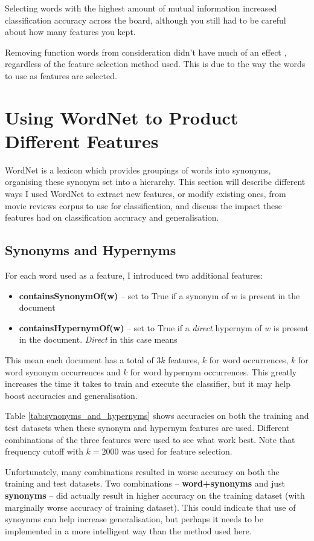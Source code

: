\documentclass{article}
\begin{document}
Selecting words with the highest amount of mutual information increased classification accuracy across the board, although you still had to be careful about how many features you kept.

Removing function words from consideration didn't have much of an effect , regardless of the feature selection method used. This is due to the way the words to use as features are selected.

\section{Using WordNet to Product Different Features}

WordNet is a lexicon which provides groupings of words into synonyms, organising these synonym set into a hierarchy. This section will describe different ways I used WordNet to extract new features, or modify existing ones, from movie reviews corpus to use for classification, and discuss the impact these features had on classification accuracy and generalisation.

\subsection{Synonyms and Hypernyms}

For each word used as a feature, I introduced two additional features:
\begin{itemize}
	\item \textbf{containsSynonymOf(w)} -- set to True if a synonym of $w$ is present in the document
	\item \textbf{containsHypernymOf(w)} -- set to True if a \textit{direct} hypernym of $w$ is present in the document. \textit{Direct} in this case means 
	\end{itemize}
This mean each document has a total of $3k$ features, $k$ for word occurrences, $k$ for word synonym occurrences and $k$ for word hypernym occurrences. This greatly increases the time it takes to train and execute the classifier, but it may help boost accuracies and generalisation.

Table \ref{tab:synonyms_and_hypernyms} shows accuracies on both the training and test datasets when these synonym and hypernym features are used. Different combinations of the three features were used to see what work best. Note that frequency cutoff with $k = 2000$ was used for feature selection.

Unfortunately, many combinations resulted in worse accuracy on both the training and test datasets. Two combinations -- \textbf{word+synonyms} and just \textbf{synonyms} -- did actually result in higher accuracy on the training dataset (with marginally worse accuracy of training dataset).  This could indicate that use of synoynms can help increase generalisation, but perhaps it needs to be implemented in a more intelligent way than the method used here.
\end{document}
